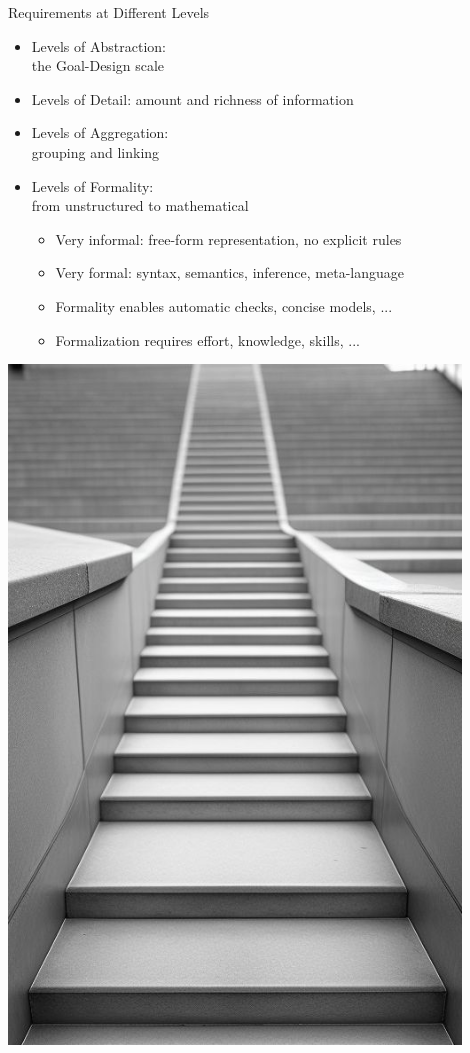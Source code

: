 \documentclass{simpleslides}
\begin{document}
\begin{frame}[fragile]{Requirements at Different Levels}
\begin{minipage}[t]{0.7\textwidth}
\vspace{0pt}
\begin{itemize}
\item Levels of Abstraction:\\the Goal-Design scale 
\item Levels of Detail: amount and richness of information 
\item Levels of Aggregation:\\grouping and linking 
\item Levels of Formality:\\from unstructured to mathematical
\begin{itemize}
\item Very informal: free-form representation, no explicit rules
\item Very formal: syntax, semantics, inference, meta-language
\item Formality enables automatic checks, concise models, ...
\item Formalization requires effort, knowledge, skills, ...
\end{itemize}
\end{itemize}
\end{minipage}%
\begin{minipage}[t]{0.35\textwidth}
\vspace{0pt}
\hfill\includegraphics[width=0.9\textwidth]{img/stairs1}
\end{minipage}%
\end{frame}
\end{document}
